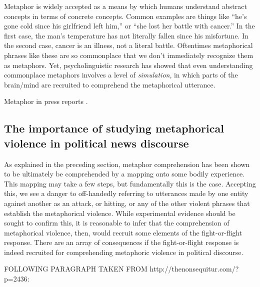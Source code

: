 Metaphor is widely accepted as a means by which humans understand abstract concepts
in terms of concrete concepts. Common examples are things like ``he's gone
cold since his girlfriend left him,'' or ``she lost her battle with cancer.''
In the first case, the man's temperature has not literally fallen since his
misfortune. In the second case, cancer is an illness, not a literal battle.
Oftentimes metaphorical phrases like these are so commonplace that we don't
immediately recognize them as metaphors. Yet, psycholinguistic research has
showed that even understanding commonplace metaphors involves a level of
\textit{simulation}, in which parts of the brain/mind are recruited to 
comprehend the metaphorical utterance.

Metaphor in press reports \cite{Burnes2011}.

\subsection{The importance of studying metaphorical violence in political news discourse}
\label{sub:The-importance-of-studying-metaphorical-violence-in-political-news-discourse}

As explained in the preceding section, metaphor comprehension has been shown
to be ultimately be comprehended by a mapping onto some bodily experience.
This mapping may take a few steps, but fundamentally this is the case.
Accepting this, we see a danger to off-handedly referring to utterances made
by one entity against another as an attack, or hitting, or any of the other
violent phrases that establish the metaphorical violence. While experimental
evidence should be sought to confirm this, it is reasonable to infer that
the comprehension of metaphorical violence, then, would recruit some elements
of the fight-or-flight response. 
There are an array of consequences if the fight-or-flight response is indeed
recruited for comprehending metaphoric violence in political discourse. 

FOLLOWING PARAGRAPH TAKEN FROM http://thenonsequitur.com/?p=2436:

